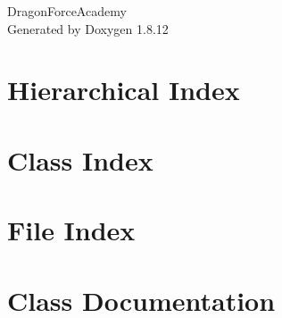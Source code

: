 \documentclass[twoside]{book}
\newcommand{\+}{\discretionary{\mbox{\scriptsize$\hookleftarrow$}}{}{}}
\newcommand{\clearemptydoublepage}{%
  \newpage{\pagestyle{empty}\cleardoublepage}%
}
\begin{document}
\hypersetup{pageanchor=false,
             bookmarksnumbered=true,
             pdfencoding=unicode
            }
\begin{titlepage}
\vspace*{7cm}
\begin{center}%
{\Large Dragon\+Force\+Academy }\\
\vspace*{1cm}
{\large Generated by Doxygen 1.8.12}\\
\end{center}
\end{titlepage}
\clearemptydoublepage
{}
\tableofcontents
\clearemptydoublepage
{}
\hypersetup{pageanchor=true}

\chapter{Hierarchical Index}

\chapter{Class Index}

\chapter{File Index}

\chapter{Class Documentation}

































\end{document}
